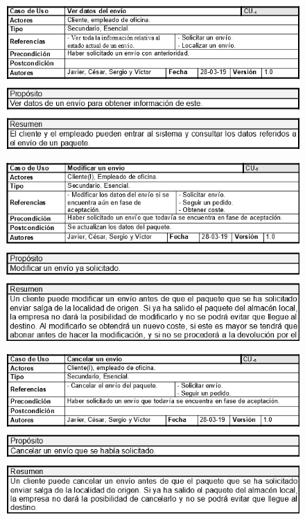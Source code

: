 \begin{figure}[H]
	\centering
	\includegraphics[width=16cm]{4}
\end{figure}
\begin{figure}[H]
	\centering
	\includegraphics[width=16cm]{5}
\end{figure}
\begin{figure}[H]
	\centering
	\includegraphics[width=16cm]{6}
\end{figure}

